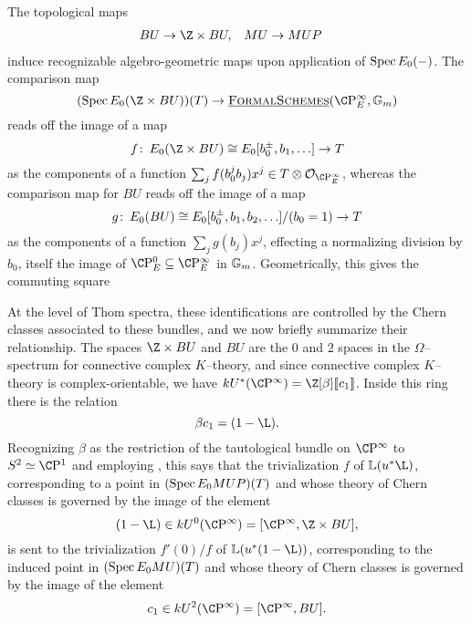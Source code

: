 \begin{remark}\label{BUtoBUZ}
The topological maps
\begin{align*}
BU & \to \Z \times BU, &
MU & \to MUP
\end{align*}
induce recognizable algebro-geometric maps upon application of $\operatorname{Spec} E_0(-)$.  The comparison map \[(\Spec E_0(\Z \times BU))(T) \to \InternalHom{FormalSchemes}(\CP^\infty_E, \Gm)\] reads off the image of a map \[f\co E_0(\Z \times BU) \cong E_0[b_0^\pm, b_1, \ldots] \to T\] as the components of a function $\sum_j f(b_0^j b_j) x^j \in T \otimes \sheaf O_{\CP^\infty_E}$, whereas the comparison map for $BU$ reads off the image of a map \[g\colon\thinspace E_0(BU) \cong E_0[b_0^\pm, b_1, b_2, \ldots] / (b_0 = 1) \to T\] as the components of a function $\sum_j g(b_j)x^j$, effecting a normalizing division by $b_0$, itself the image of $\CP^0_E \subseteq \CP^\infty_E$ in $\mathbb G_m$.  Geometrically, this gives the commuting square
\begin{center}
\end{center}

At the level of Thom spectra, these identifications are controlled by the Chern classes associated to these bundles, and we now briefly summarize their relationship.  The spaces $\Z \times BU$ and $BU$ are the $0${\th} and $2${\nd} spaces in the $\Omega$--spectrum for connective complex $K$--theory, and since connective complex $K$--theory is complex-orientable, we have $kU^*(\CP^\infty) = \Z[\beta]\ps{c_1}$.  Inside this ring there is the relation \[\beta c_1 = (1 - \L).\]  Recognizing $\beta$ as the restriction of the tautological bundle on $\CP^\infty$ to $S^2 \simeq \CP^1$ and employing , this says that the trivialization $f$ of $\ThomSheaf{u^* \L}$, corresponding to a point in $(\operatorname{Spec} E_0 MUP)(T)$ and whose theory of Chern classes is governed by the image of the element \[(1 - \L) \in kU^0(\CP^\infty) = [\CP^\infty, \Z \times BU],\] is sent to the trivialization $f'(0) / f$ of $\ThomSheaf{u^*(1 - \L)}$, corresponding to the induced point in $(\operatorname{Spec} E_0 MU)(T)$ and whose theory of Chern classes is governed by the image of the element \[c_1 \in kU^2(\CP^\infty) = [\CP^\infty, BU].\]
\end{remark}


